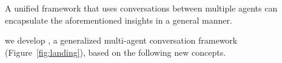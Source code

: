 {%

 A unified framework that uses conversations between multiple agents can encapsulate the aforementioned insights in a general manner. 
}
we develop \libName,
a generalized multi-agent conversation framework (Figure~\ref{fig:landing}),
based on the following new concepts.
